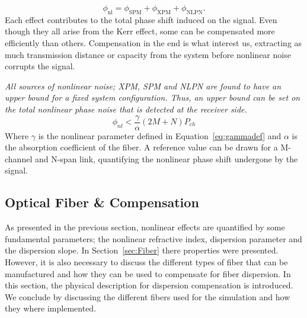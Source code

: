 \begin{equation}
\phi_{\text{nl}}=\phi_{\text{SPM}}+\phi_{\text{XPM}}+\phi_{\text{NLPN}}.
\end{equation} 
Each effect contributes to the total phase shift induced on the signal. Even though they all arise from the Kerr effect, some can be compensated more efficiently than others. Compensation in the end is what interest us, extracting as much transmission distance or capacity from the system before nonlinear noise corrupts the signal.  



        
\begin{tcolorbox}[title= Bound Nonlinear Phase Shift ]
\emph{All sources of nonlinear noise; XPM, SPM and NLPN are found to have an upper bound for a fixed system configuration. Thus, an upper bound can be set on the total nonlinear phase noise that is detected at the receiver side.  }
\begin{equation}
\phi_{nl}<\frac{\gamma}{\alpha}\left (2M+N\right )P_{ch}
\end{equation}
Where $\gamma$ is the nonlinear parameter defined in Equation~\ref{eq:gammadef} and $\alpha$ is the absorption coefficient of the fiber. A reference value can be drawn for a M-channel and N-span link, quantifying the nonlinear phase shift undergone by the signal.  
\end{tcolorbox}

\subsection{Optical Fiber \& Compensation }
As presented in the previous section, nonlinear effects are quantified by some fundamental parameters; the  nonlinear refractive index, dispersion parameter and the dispersion slope. In Section~\ref{sec:Fiber} there properties were presented. However, it is also necessary to discuss the different types of fiber that can be manufactured and how they can be used to compensate for fiber dispersion.  In this section, the physical description for  dispersion compensation is introduced. We conclude by discussing the different fibers used for the simulation and how they where implemented.    
